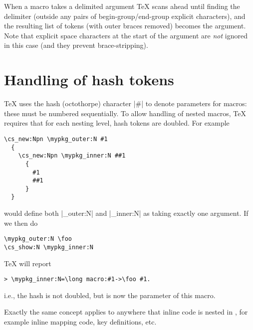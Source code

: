 \documentclass{l3doc}
\begin{document}
When a macro takes a delimited argument \TeX{} scans ahead until finding
the delimiter (outside any pairs of begin-group/end-group explicit
characters), and the resulting list of tokens (with outer braces
removed) becomes the argument.  Note that explicit space characters at
the start of the argument are \emph{not} ignored in this case (and they
prevent brace-stripping).

\section{Handling of hash tokens}

\TeX{} uses the hash (octothorpe) character |#| to denote parameters for
macros: these must be numbered sequentially. To allow handling of nested
macros, \TeX{} requires that for each nesting level, hash tokens are doubled.
For example
\begin{verbatim}
\cs_new:Npn \mypkg_outer:N #1
  {
    \cs_new:Npn \mypkg_inner:N ##1
      {
        #1
        ##1
      }
  }
\end{verbatim}
would define both |\mypkg_outer:N| and |\mypkg_inner:N| as taking
exactly one argument. If we then do
\begin{verbatim}
\mypkg_outer:N \foo
\cs_show:N \mypkg_inner:N
\end{verbatim}
\TeX{} will report
\begin{verbatim}
> \mypkg_inner:N=\long macro:#1->\foo #1.
\end{verbatim}
i.e., the hash is not doubled, but is now the parameter of this macro.

Exactly the same concept applies to anywhere that inline code is nested in
, for example inline mapping code, key definitions, etc.
\end{document}
